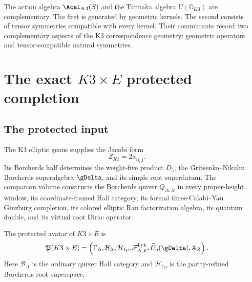 The action algebra $\Acal_{K3}(S)$ and the Tannaka algebra $U(\mathbb G_{K3})$ are complementary.  The first is generated by geometric kernels.  The second consists of tensor symmetries compatible with every kernel.  Their commutants record two complementary aspects of the K3 correspondence geometry: geometric operators and tensor-compatible natural symmetries.

\part{The exact \texorpdfstring{$K3\times E$}{K3 x E} protected completion}

\chapter{The protected input}
The K3 elliptic genus supplies the Jacobi form
\[
 Z_{K3}=2\phi_{0,1}.
\]
Its Borcherds half determines the weight-five product $D_5$, the Gritsenko--Nikulin Borcherds superalgebra $\gDelta$, and its simple-root superdatum.  The companion volume constructs the Borcherds quiver $Q_{\Delta,H}$ in every proper-height window, its coordinate-framed Hall category, its formal three-Calabi--Yau Ginzburg completion, its colored elliptic Ran factorization algebra, its quantum double, and its virtual root Dirac operator.

\begin{definition}
The protected avatar of $K3\times E$ is
\[
 \mathfrak P(K3\times E)=
 \left(
 \Gamma_\Delta,
 \mathcal B_\Delta,
 \mathcal H_{\mathrm{1p}},
 \mathcal F^{\mathrm{hyb}}_{\Delta,E},
 \widehat U_q(\gDelta),
 \mathbb A_Z
 \right).
\]
Here $\mathcal B_\Delta$ is the ordinary quiver Hall category and $\mathcal H_{\mathrm{1p}}$ is the parity-refined Borcherds root superspace.
\end{definition}

